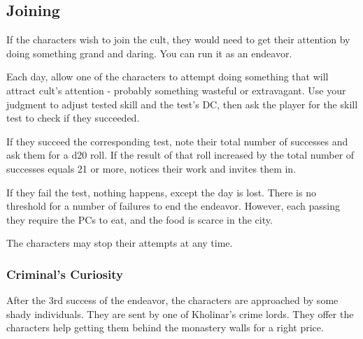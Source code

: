 \subsection{Joining \npcFractionCult{}}
\label{ssec:cityEscapePlanJoin}

If the characters wish to join the cult, they would need to get their attention by doing something grand and daring. You can run it as an endeavor.

Each day, allow one of the characters to attempt doing something that will attract cult's attention - probably something wasteful or extravagant. Use your judgment to adjust tested skill and the test's DC, then ask the player for the skill test to check if they succeeded.

If they succeed the corresponding test, note their total number of successes and ask them for a d20 roll. If the result of that roll increased by the total number of successes equals 21 or more, \npcFractionCult{} notices their work and invites them in.

If they fail the test, nothing happens, except the day is lost. There is no threshold for a number of failures to end the endeavor. However, each passing they require the PCs to eat, and the food is scarce in the city.

The characters may stop their attempts at any time.


\subsubsection{Criminal's Curiosity}
\label{ssec:cityEscapePlanCriminals}

After the 3rd success of the endeavor, the characters are approached by some shady individuals. They are sent by one of Kholinar's crime lords. They offer the characters help getting them behind the monastery walls for a right price. 

